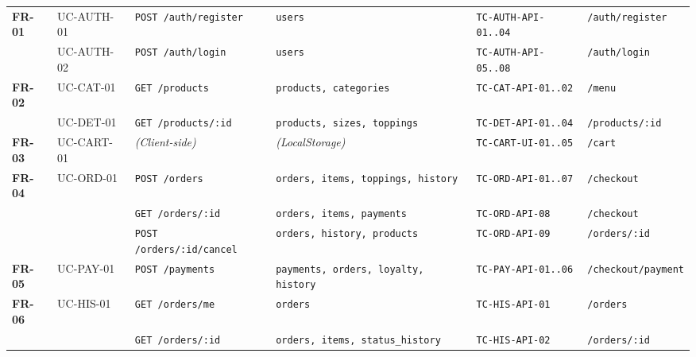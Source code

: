 \begin{longtable}{p{1.2cm}p{2.2cm}p{3.2cm}p{3cm}p{2.5cm}p{2.2cm}}
\textbf{FR-01} & UC-AUTH-01 & \texttt{POST /auth/register} & \texttt{users} & \texttt{TC-AUTH-API-01..04} & \texttt{/auth/register} \\
& UC-AUTH-02 & \texttt{POST /auth/login} & \texttt{users} & \texttt{TC-AUTH-API-05..08} & \texttt{/auth/login} \\
\midrule
\textbf{FR-02} & UC-CAT-01 & \texttt{GET /products} & \texttt{products, categories} & \texttt{TC-CAT-API-01..02} & \texttt{/menu} \\
& UC-DET-01 & \texttt{GET /products/:id} & \texttt{products, sizes, toppings} & \texttt{TC-DET-API-01..04} & \texttt{/products/:id} \\
\midrule
\textbf{FR-03} & UC-CART-01 & \textit{(Client-side)} & \textit{(LocalStorage)} & \texttt{TC-CART-UI-01..05} & \texttt{/cart} \\
\midrule
\textbf{FR-04} & UC-ORD-01 & \texttt{POST /orders} & \texttt{orders, items, toppings, history} & \texttt{TC-ORD-API-01..07} & \texttt{/checkout} \\
& & \texttt{GET /orders/:id} & \texttt{orders, items, payments} & \texttt{TC-ORD-API-08} & \texttt{/checkout} \\
& & \texttt{POST /orders/:id/cancel} & \texttt{orders, history, products} & \texttt{TC-ORD-API-09} & \texttt{/orders/:id} \\
\midrule
\textbf{FR-05} & UC-PAY-01 & \texttt{POST /payments} & \texttt{payments, orders, loyalty, history} & \texttt{TC-PAY-API-01..06} & \texttt{/checkout/payment} \\
\midrule
\textbf{FR-06} & UC-HIS-01 & \texttt{GET /orders/me} & \texttt{orders} & \texttt{TC-HIS-API-01} & \texttt{/orders} \\
& & \texttt{GET /orders/:id} & \texttt{orders, items, status\_history} & \texttt{TC-HIS-API-02} & \texttt{/orders/:id} \\
\end{longtable}
